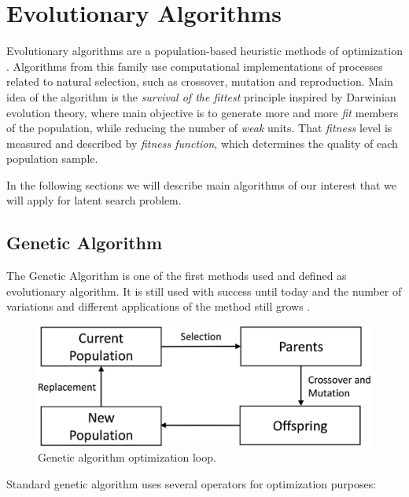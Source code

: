 \documentclass[11pt,a4paper,openany]{book}
\begin{document}
\newpage
\section{Evolutionary Algorithms}

\noindent Evolutionary algorithms are a population-based heuristic methods of optimization \cite{de}. Algorithms from this family use computational implementations of processes related to natural selection, such as crossover, mutation and reproduction. Main idea of the algorithm is the \textit{survival of the fittest} principle inspired by Darwinian evolution theory, where main objective is to generate more and more \textit{fit} members of the population, while reducing the number of \textit{weak} units. That \textit{fitness} level is measured and described by \textit{fitness function}, which determines the quality of each population sample.

\noindent In the following sections we will describe main algorithms of our interest that we will apply for latent search problem. 
\subsection{Genetic Algorithm}


\noindent The Genetic Algorithm is one of the first methods used and defined as evolutionary algorithm. It is still used with success until today and the number of variations and different applications of the method still grows \cite{ea}.

 \begin{figure}[ht!]
     \centering
     \includegraphics[scale=0.22]{figs/gen-algo.eps}
     \caption{Genetic algorithm optimization loop.}\label{Fig:genalgo1}
 \end{figure}


\noindent Standard genetic algorithm uses several operators for optimization purposes:
\end{document}
